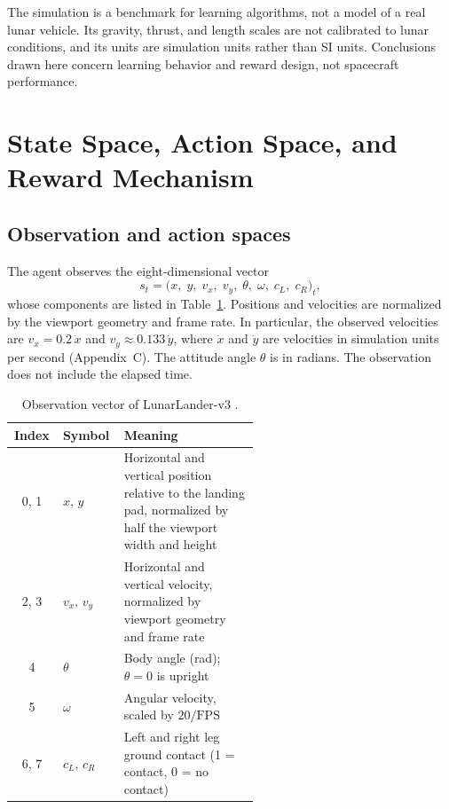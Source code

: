 \documentclass[11pt,a4paper]{article}
\begin{document}
The simulation is a benchmark for learning algorithms, not a model of a real lunar vehicle. Its gravity, thrust, and length scales are not calibrated to lunar conditions, and its units are simulation units rather than SI units. Conclusions drawn here concern learning behavior and reward design, not spacecraft performance.

\section{State Space, Action Space, and Reward Mechanism}\label{sec:states}

\subsection{Observation and action spaces}

The agent observes the eight-dimensional vector
\begin{equation}
  s_t = \big(x,\; y,\; v_x,\; v_y,\; \theta,\; \omega,\; c_L,\; c_R\big)_t, \label{eq:state}
\end{equation}
whose components are listed in Table~\ref{tab:obs}. Positions and velocities are normalized by the viewport geometry and frame rate. In particular, the observed velocities are $v_x = 0.2\,\dot x$ and $v_y \approx 0.133\,\dot y$, where $\dot x$ and $\dot y$ are velocities in simulation units per second (Appendix~C). The attitude angle $\theta$ is in radians. The observation does not include the elapsed time.

\begin{table}[!htb]
\caption[Observation vector of LunarLander-v3]{Observation vector of LunarLander-v3 \cite{gymLunar,gymSource}.}\label{tab:obs}
\centering\small
\begin{tabular}{@{}clp{0.55\linewidth}@{}}
\toprule
Index & Symbol & Meaning \\
\midrule
0, 1 & $x,\,y$ & Horizontal and vertical position relative to the landing pad, normalized by half the viewport width and height \\
2, 3 & $v_x,\,v_y$ & Horizontal and vertical velocity, normalized by viewport geometry and frame rate \\
4 & $\theta$ & Body angle (rad); $\theta=0$ is upright \\
5 & $\omega$ & Angular velocity, scaled by $20/\text{FPS}$ \\
6, 7 & $c_L,\,c_R$ & Left and right leg ground contact (1 = contact, 0 = no contact) \\
\bottomrule
\end{tabular}
\end{table}
\end{document}
